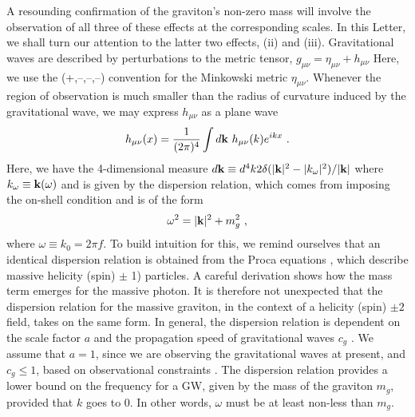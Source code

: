 \documentclass[prd,twocolumn,aps,psfig,nofootinbib,nobibnotes,superscriptaddress,preprintnumbers,times]{revtex4-2}
\begin{document}
A resounding confirmation of the graviton's non-zero mass will involve the observation of all three of these effects at the corresponding scales. In this Letter, we shall turn our attention to the latter two effects, (ii) and (iii). Gravitational waves are described by perturbations to the
metric tensor, $g_{\mu\nu} = \eta_{\mu\nu} + h_{\mu\nu}$
%
Here, we use the (+,--,--,--) convention for the Minkowski metric $\eta_{\mu\nu}$. Whenever the region of observation is much smaller than the radius of curvature induced by the gravitational wave, we may express $h_{\mu\nu}$ as a plane wave \cite{Isi:2018miq}
\begin{equation}\label{eqn:planewave}
    h_{\mu\nu}(x) = \frac{1}{(2\pi)^4}\int d{\bf k} \ h_{\mu\nu}(k) e^{ikx} \ .
\end{equation}
Here, we have the 4-dimensional measure $d{\bf k} \equiv d^4 k 2\delta(|{\bf k}|^2 - |k_{\omega}|^2)/|{\bf k}|$ where $k_{\omega} \equiv {\bf k}(\omega)$ and is given by the dispersion relation, which comes from imposing the on-shell condition \cite{Liang:2021bct} and is of the form 
\begin{equation}\label{eq:dispersion}
    \omega^2 = |{\bf k}|^2+ m_g^2 \ ,
\end{equation}
where $\omega \equiv k_0 = 2\pi f$.
To build intuition for this, we remind ourselves that an identical dispersion relation is obtained from the Proca equations \cite{Proca:1936fbw}, which describe massive helicity (spin) $\pm$ 1) particles. A careful derivation shows how the mass term emerges \cite{Wang:2024kir} for the massive photon. It is therefore not unexpected that the dispersion relation for the massive graviton, in the context of a helicity (spin) $\pm 2$ field, takes on the same form. In general, the dispersion relation is dependent on the scale factor $a$ and the propagation speed of gravitational waves $c_g$ \cite{Gumrukcuoglu:2012wt}. We assume that $a=1$, since we are observing the gravitational waves at present, and $c_g \leq  1$, based on observational constraints \cite{LIGOScientific:2017vwq, LIGOScientific:2017zic, LIGOScientific:2017ync}.
The dispersion relation provides a lower bound on the frequency for a GW, given by the mass of the graviton $m_g$, provided that $k$ goes to 0. In other words, $\omega$ must be at least non-less than $m_g$. 
\end{document}
